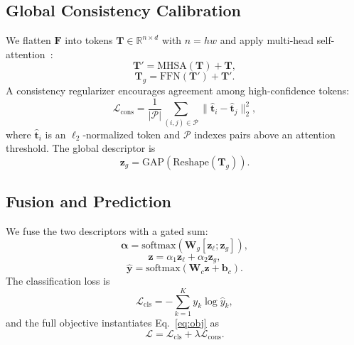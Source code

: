 \documentclass[11pt,a4paper]{article}
\begin{document}
\subsection{Global Consistency Calibration}
\label{sec:gcc}
We flatten $\mathbf{F}$ into tokens $\mathbf{T}\in\mathbb{R}^{n\times d}$ with $n=hw$ and apply multi-head self-attention~\cite{vaswani2017attention}:
\begin{equation}
\mathbf{T}'=\mathrm{MHSA}(\mathbf{T})+\mathbf{T},
\label{eq:mhsa}
\end{equation}
\begin{equation}
\mathbf{T}_{g}=\mathrm{FFN}(\mathbf{T}')+\mathbf{T}'.
\label{eq:ffn}
\end{equation}
A consistency regularizer encourages agreement among high-confidence tokens:
\begin{equation}
\mathcal{L}_{\mathrm{cons}}=\frac{1}{|\mathcal{P}|}\sum_{(i,j)\in\mathcal{P}}\big\|\hat{\mathbf{t}}_{i}-\hat{\mathbf{t}}_{j}\big\|_2^{2},
\label{eq:cons}
\end{equation}
where $\hat{\mathbf{t}}_{i}$ is an $\ell_2$-normalized token and $\mathcal{P}$ indexes pairs above an attention threshold.
The global descriptor is
\begin{equation}
\mathbf{z}_{g}=\mathrm{GAP}(\mathrm{Reshape}(\mathbf{T}_{g})).
\label{eq:global_pool}
\end{equation}

\subsection{Fusion and Prediction}
\label{sec:fuse}
We fuse the two descriptors with a gated sum:
\begin{equation}
\boldsymbol{\alpha}=\mathrm{softmax}(\mathbf{W}_{g}[\mathbf{z}_{\ell};\mathbf{z}_{g}]),
\label{eq:gate}
\end{equation}
\begin{equation}
\mathbf{z}=\alpha_{1}\mathbf{z}_{\ell}+\alpha_{2}\mathbf{z}_{g},
\label{eq:fuse}
\end{equation}
\begin{equation}
\hat{\mathbf{y}}=\mathrm{softmax}(\mathbf{W}_{c}\mathbf{z}+\mathbf{b}_{c}).
\label{eq:pred}
\end{equation}
The classification loss is
\begin{equation}
\mathcal{L}_{\mathrm{cls}}=-\sum_{k=1}^{K}y_{k}\log\hat{y}_{k},
\label{eq:ce}
\end{equation}
and the full objective instantiates Eq.~\eqref{eq:obj} as
\begin{equation}
\mathcal{L}=\mathcal{L}_{\mathrm{cls}}+\lambda\mathcal{L}_{\mathrm{cons}}.
\label{eq:total}
\end{equation}
\end{document}
